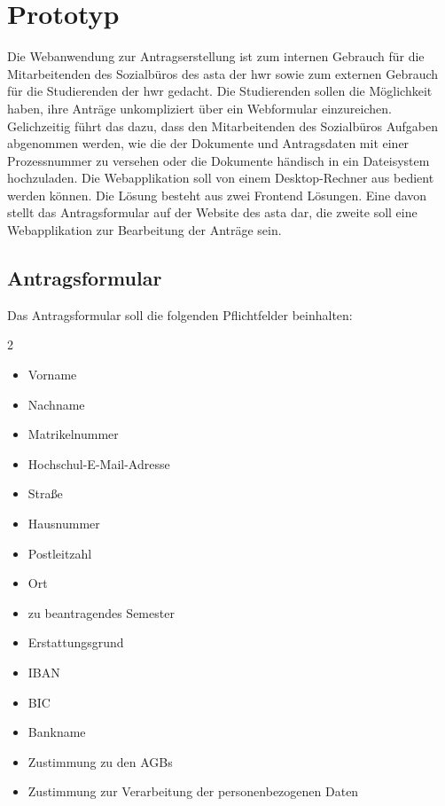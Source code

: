 
\chapter{Prototyp}\label{cha:prototyp}
Die Webanwendung zur Antragserstellung ist zum internen Gebrauch für die Mitarbeitenden des Sozialbüros des \gls{asta} der \gls{hwr} sowie zum externen Gebrauch für die Studierenden der \gls{hwr} gedacht. Die Studierenden sollen die Möglichkeit haben, ihre Anträge unkompliziert über ein Webformular einzureichen. Gelichzeitig führt das dazu, dass den Mitarbeitenden des Sozialbüros Aufgaben abgenommen werden, wie die der Dokumente und Antragsdaten mit einer Prozessnummer zu versehen oder die Dokumente händisch in ein Dateisystem hochzuladen. Die Webapplikation soll von einem Desktop-Rechner aus bedient werden können. Die Lösung besteht aus zwei Frontend Lösungen. Eine davon stellt das Antragsformular auf der Website des \gls{asta} dar, die zweite soll eine Webapplikation zur Bearbeitung der Anträge sein. 

\section{Antragsformular}\label{sec:antragsformular}
Das Antragsformular soll die folgenden Pflichtfelder beinhalten: 
\begin{multicols}{2}
\begin{itemize}[noitemsep, topsep=4pt]
    \item Vorname
    \item Nachname
    \item Matrikelnummer
    \item Hochschul-E-Mail-Adresse
    \item Straße
    \item Hausnummer
    \item Postleitzahl 
    \item Ort 
    \item zu beantragendes Semester
    \item Erstattungsgrund
    \item IBAN 
    \item BIC 
    \item Bankname
    \item Zustimmung zu den AGBs 
    \item Zustimmung zur Verarbeitung der personenbezogenen Daten
\end{itemize}
\end{multicols}

